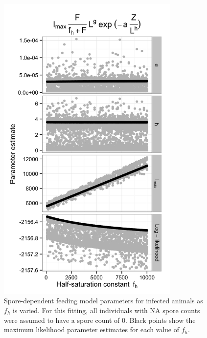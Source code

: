 \documentclass[12pt,reqno,final,pdftex]{amsart}\usepackage[]{graphicx}\usepackage[]{color}
\newenvironment{knitrout}{}{} %
\theoremstyle{plain}
\numberwithin{equation}{part}
\begin{document}
\begin{knitrout}\scriptsize
{}\color{fgcolor}\begin{figure}

\includegraphics[width=0.8\textwidth]{figure/spore-dep-feeding-2-1} \hfill{}

\caption[Spore-dependent feeding model parameters for infected animals as ]{Spore-dependent feeding model parameters for infected animals as $f_h$ is varied. For this fitting, all individuals with NA spore counts were assumed to have a spore count of 0. Black points show the maximum likelihood parameter estimates for each value of $f_h$.}\label{fig:spore-dep-feeding-2}
\end{figure}


\end{knitrout}
\end{document}
